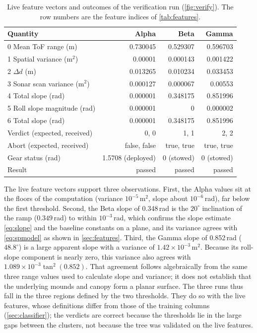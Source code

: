 \documentclass[11pt,a4paper]{article}
\begin{document}
\begin{table}[ht]
\centering
\small
\begin{tabular}{@{}l r r r@{}}
\toprule
\textbf{Quantity} & \textbf{Alpha} & \textbf{Beta} & \textbf{Gamma}\\
\midrule
0 Mean ToF range (m) & 0.730045 & 0.529307 & 0.596703\\
1 Spatial variance (m$^2$) & 0.00001 & 0.000143 & 0.001422\\
2 $\Delta d$ (m) & 0.013265 & 0.010234 & 0.033453\\
3 Sonar scan variance (m$^2$) & 0.000127 & 0.000067 & 0.00553\\
4 Total slope (rad) & 0.000001 & 0.348175 & 0.851996\\
5 Roll slope magnitude (rad) & 0.000001 & 0 & 0.000002\\
6 Total slope (rad) & 0.000001 & 0.348175 & 0.851996\\
\midrule
Verdict (expected, received) & 0, 0 & 1, 1 & 2, 2\\
Abort (expected, received) & false, false & true, true & true, true\\
Gear status (rad) & 1.5708 (deployed) & 0 (stowed) & 0 (stowed)\\
Result & passed & passed & passed\\
\bottomrule
\end{tabular}
\caption{Live feature vectors and outcomes of the verification run (\cref{fig:verify}). The row numbers are the feature indices of \cref{tab:features}.}
\label{tab:featvals}
\end{table}

\noindent
The live feature vectors support three observations. First, the Alpha values sit at the floors of the computation (variance $10^{-5}$\,m$^2$, slope about $10^{-6}$\,rad), far below the first threshold. Second, the Beta slope of 0.348\,rad is the $20^\circ$ inclination of the ramp ($0.349$\,rad) to within $10^{-3}$\,rad, which confirms the slope estimate \eqref{eq:slope} and the baseline constants on a plane, and its variance agrees with \eqref{eq:spmodel} as shown in \cref{sec:features}. Third, the Gamma slope of 0.852\,rad ($48.8^\circ$) is a large apparent slope with a variance of $1.42\times10^{-3}$\,m$^2$. Because its roll-slope component is nearly zero, this variance also agrees with $1.089\times10^{-3}\tan^2(0.852)$. That agreement follows algebraically from the same three range values used to calculate slope and variance; it does not establish that the underlying mounds and canopy form a planar surface. The three runs thus fall in the three regions defined by the two thresholds. They do so with the live features, whose definitions differ from those of the training columns (\cref{sec:classifier}); the verdicts are correct because the thresholds lie in the large gaps between the clusters, not because the tree was validated on the live features.
 
\end{document}

